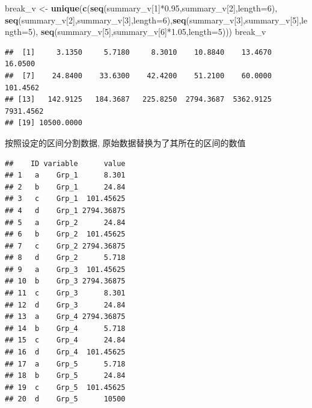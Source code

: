 \documentclass[]{article}
\newenvironment{Shaded}{\begin{snugshade}}{\end{snugshade}}
\newcommand{\KeywordTok}[1]{\textcolor[rgb]{0.13,0.29,0.53}{\textbf{{#1}}}}
\newcommand{\DataTypeTok}[1]{\textcolor[rgb]{0.13,0.29,0.53}{{#1}}}
\newcommand{\DecValTok}[1]{\textcolor[rgb]{0.00,0.00,0.81}{{#1}}}
\newcommand{\FloatTok}[1]{\textcolor[rgb]{0.00,0.00,0.81}{{#1}}}
\newcommand{\StringTok}[1]{\textcolor[rgb]{0.31,0.60,0.02}{{#1}}}
\newcommand{\NormalTok}[1]{{#1}}
\numberwithin{figure}{section}
\numberwithin{table}{section}
\theoremstyle{definition}
\theoremstyle{definition}
\theoremstyle{definition}
\theoremstyle{remark}
\begin{document}
\begin{Shaded}
\begin{Highlighting}[]
\NormalTok{break_v <-}\StringTok{ }\KeywordTok{unique}\NormalTok{(}\KeywordTok{c}\NormalTok{(}\KeywordTok{seq}\NormalTok{(summary_v[}\DecValTok{1}\NormalTok{]*}\FloatTok{0.95}\NormalTok{,summary_v[}\DecValTok{2}\NormalTok{],}\DataTypeTok{length=}\DecValTok{6}\NormalTok{), }
        \KeywordTok{seq}\NormalTok{(summary_v[}\DecValTok{2}\NormalTok{],summary_v[}\DecValTok{3}\NormalTok{],}\DataTypeTok{length=}\DecValTok{6}\NormalTok{),}\KeywordTok{seq}\NormalTok{(summary_v[}\DecValTok{3}\NormalTok{],summary_v[}\DecValTok{5}\NormalTok{],}\DataTypeTok{length=}\DecValTok{5}\NormalTok{),}
        \KeywordTok{seq}\NormalTok{(summary_v[}\DecValTok{5}\NormalTok{],summary_v[}\DecValTok{6}\NormalTok{]*}\FloatTok{1.05}\NormalTok{,}\DataTypeTok{length=}\DecValTok{5}\NormalTok{)))}
\NormalTok{break_v}
\end{Highlighting}
\end{Shaded}

\begin{verbatim}
##  [1]     3.1350     5.7180     8.3010    10.8840    13.4670    16.0500
##  [7]    24.8400    33.6300    42.4200    51.2100    60.0000   101.4562
## [13]   142.9125   184.3687   225.8250  2794.3687  5362.9125  7931.4562
## [19] 10500.0000
\end{verbatim}

按照设定的区间分割数据, 原始数据替换为了其所在的区间的数值

\begin{Shaded}
\end{Shaded}

\begin{verbatim}
##    ID variable      value
## 1   a    Grp_1      8.301
## 2   b    Grp_1      24.84
## 3   c    Grp_1  101.45625
## 4   d    Grp_1 2794.36875
## 5   a    Grp_2      24.84
## 6   b    Grp_2  101.45625
## 7   c    Grp_2 2794.36875
## 8   d    Grp_2      5.718
## 9   a    Grp_3  101.45625
## 10  b    Grp_3 2794.36875
## 11  c    Grp_3      8.301
## 12  d    Grp_3      24.84
## 13  a    Grp_4 2794.36875
## 14  b    Grp_4      5.718
## 15  c    Grp_4      24.84
## 16  d    Grp_4  101.45625
## 17  a    Grp_5      5.718
## 18  b    Grp_5      24.84
## 19  c    Grp_5  101.45625
## 20  d    Grp_5      10500
\end{verbatim}
\end{document}
